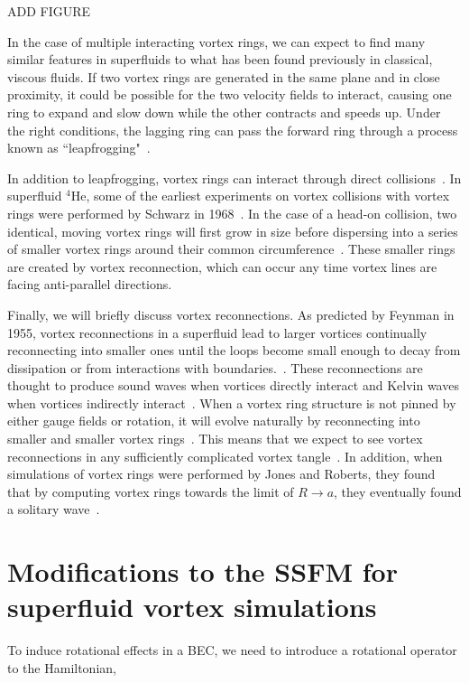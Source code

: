 ADD FIGURE

In the case of multiple interacting vortex rings, we can expect to find many similar features in superfluids to what has been found previously in classical, viscous fluids. 
If two vortex rings are generated in the same plane and in close proximity, it could be possible for the two velocity fields to interact, causing one ring to expand and slow down while the other contracts and speeds up. 
Under the right conditions, the lagging ring can pass the forward ring through a process known as ``leapfrogging"~\cite{Sommerfield1950, Caplan2014}.

In addition to leapfrogging, vortex rings can interact through direct collisions~\cite{Shariff1992}. 
In superfluid $^4$He, some of the earliest experiments on vortex collisions with vortex rings were performed by Schwarz in 1968~\cite{Schwarz1968}.
In the case of a head-on collision, two identical, moving vortex rings will first grow in size before dispersing into a series of smaller vortex rings around their common circumference~\cite{Lim1995}. 
These smaller rings are created by vortex reconnection, which can occur any time vortex lines are facing anti-parallel directions.

Finally, we will briefly discuss vortex reconnections.
As predicted by Feynman in 1955, vortex reconnections in a superfluid lead to larger vortices continually reconnecting into smaller ones until the loops become small enough to decay from dissipation or from interactions with boundaries.~\cite{Feynman1955}.
These reconnections are thought to produce sound waves when vortices directly interact and Kelvin waves when vortices indirectly interact~\cite{Paoletti2011}.
When a vortex ring structure is not pinned by either gauge fields or rotation, it will evolve naturally by reconnecting into smaller and smaller vortex rings~\cite{Jackson1999}. 
This means that we expect to see vortex reconnections in any sufficiently complicated vortex tangle~\cite{Barenghi2014}.
In addition, when simulations of vortex rings were performed by Jones and Roberts, they found that by computing vortex rings towards the limit of $R \rightarrow a$, they eventually found a solitary wave~\cite{Jones1982, Berloff2005}.

\section{Modifications to the SSFM for superfluid vortex simulations}

To induce rotational effects in a BEC, we need to introduce a rotational operator to the Hamiltonian,

